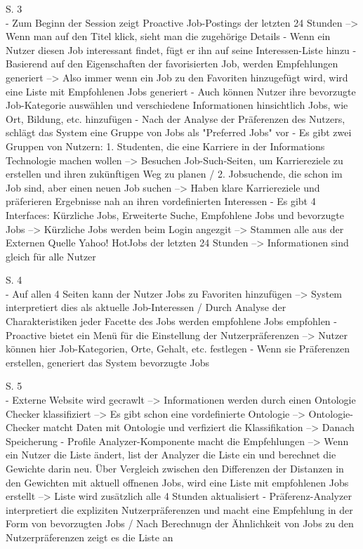 S. 3\\
- Zum Beginn der Session zeigt Proactive Job-Postings der letzten 24 Stunden --> Wenn man auf den Titel klick, sieht man die zugehörige Details
- Wenn ein Nutzer diesen Job interessant findet, fügt er ihn auf seine Interessen-Liste hinzu
- Basierend auf den Eigenschaften der favorisierten Job, werden Empfehlungen generiert --> Also immer wenn ein Job zu den Favoriten hinzugefügt wird, wird eine Liste mit Empfohlenen Jobs generiert
- Auch können Nutzer ihre bevorzugte Job-Kategorie auswählen und verschiedene Informationen hinsichtlich Jobs, wie Ort, Bildung, etc. hinzufügen
- Nach der Analyse der Präferenzen des Nutzers, schlägt das System eine Gruppe von Jobs als "Preferred Jobs" vor
- Es gibt zwei Gruppen von Nutzern: 1. Studenten, die eine Karriere in der Informations Technologie machen wollen --> Besuchen Job-Such-Seiten, um Karriereziele zu erstellen und ihren zukünftigen Weg zu planen / 2. Jobsuchende, die schon im Job sind, aber einen neuen Job suchen --> Haben klare Karriereziele und präferieren Ergebnisse nah an ihren vordefinierten Interessen
- Es gibt 4 Interfaces: Kürzliche Jobs, Erweiterte Suche, Empfohlene Jobs und bevorzugte Jobs --> Kürzliche Jobs werden beim Login angezgit --> Stammen alle aus der Externen Quelle Yahoo! HotJobs der letzten 24 Stunden --> Informationen sind gleich für alle Nutzer

S. 4\\
- Auf allen 4 Seiten kann der Nutzer Jobs zu Favoriten hinzufügen --> System interpretiert dies als aktuelle Job-Interessen / Durch Analyse der Charakteristiken jeder Facette des Jobs werden empfohlene Jobs empfohlen
- Proactive bietet ein Menü für die Einstellung der Nutzerpräferenzen --> Nutzer können hier Job-Kategorien, Orte, Gehalt, etc. festlegen
- Wenn sie Präferenzen erstellen, generiert das System bevorzugte Jobs

S. 5\\
- Externe Website wird gecrawlt --> Informationen werden durch einen Ontologie Checker klassifiziert --> Es gibt schon eine vordefinierte Ontologie --> Ontologie-Checker matcht Daten mit Ontologie und verfiziert die Klassifikation --> Danach Speicherung
- Profile Analyzer-Komponente macht die Empfehlungen --> Wenn ein Nutzer die Liste ändert, list der Analyzer die Liste ein und berechnet die Gewichte darin neu. Über Vergleich zwischen den Differenzen der Distanzen in den Gewichten mit aktuell offnenen Jobs, wird eine Liste mit empfohlenen Jobs erstellt --> Liste wird zusätzlich alle 4 Stunden aktualisiert
- Präferenz-Analyzer interpretiert die expliziten Nutzerpräferenzen und macht eine Empfehlung in der Form von bevorzugten Jobs / Nach Berechnugn der Ähnlichkeit von Jobs zu den Nutzerpräferenzen zeigt es die Liste an

